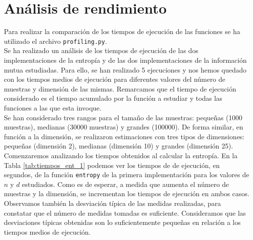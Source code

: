 \documentclass[12pt,a4paper]{report} %
\theoremstyle{definition}
\begin{document}
\section{Análisis de rendimiento}

Para realizar la comparación de los tiempos de ejecución de las funciones se ha utilizado el archivo \texttt{profiling.py}.\\

Se ha realizado un análisis de los tiempos de ejecución de las dos implementaciones de la entropía y de las dos implementaciones de la información mutua estudiadas. Para ello, se han realizado 5 ejecuciones y nos hemos quedado con los tiempos medios de ejecución para diferentes valores del número de muestras y dimensión de las mismas. Remarcamos que el tiempo de ejecución considerado es el tiempo acumulado por la función a estudiar y todas las funciones a las que esta invoque.\\

Se han considerado tres rangos para el tamaño de las muestras: pequeñas (1000 muestras), medianas (30000 muestras) y grandes (100000). De forma similar, en función a la dimensión, se realizaron estimaciones con tres tipos de dimensiones: pequeñas (dimensión 2), medianas (dimensión 10) y grandes (dimensión 25).\\

Comenzaremos analizando los tiempos obtenidos al calcular la entropía. En la Tabla \ref{tab:tiempos_ent_1} podemos ver los tiempos de de ejecución, en segundos, de la función \texttt{entropy} de la primera implementación para los valores de $n$ y $d$ estudiados. Como es de esperar, a medida que aumenta el número de muestras y la dimensión, se incrementan los tiempos de ejecución en ambos casos. Observamos también la desviación típica de las medidas realizadas, para constatar que el número de medidas tomadas es suficiente. Consideramos que las desviaciones típicas obtenidas son lo suficientemente pequeñas en relación a los tiempos medios de ejecución.\\
\end{document}
